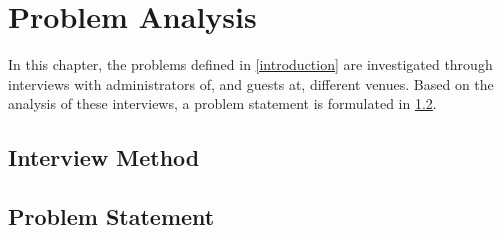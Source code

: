 \chapter{Problem Analysis}
\label{cha:problem_analysis}

In this chapter, the problems defined in \cref{introduction} are
investigated through interviews with administrators of, and guests at,
different venues. Based on the analysis of these interviews, a problem statement
is formulated in \cref{ProblemStatement}.

\section{Interview Method}




\section{Problem Statement}
\label{ProblemStatement}

